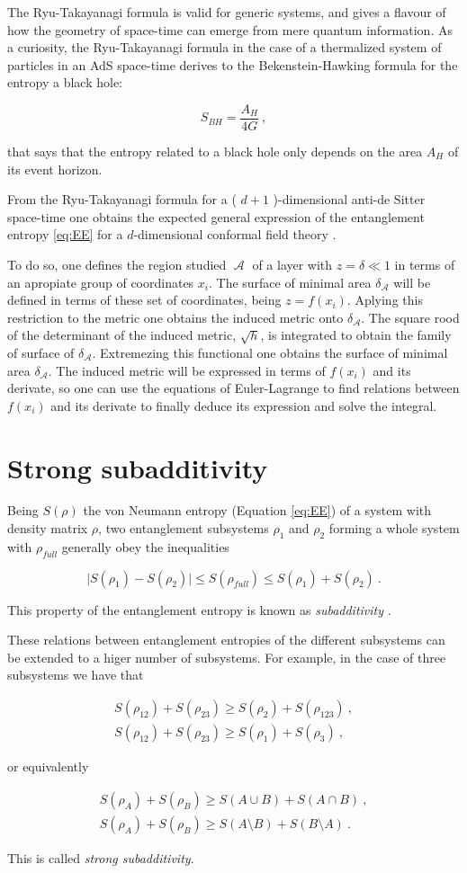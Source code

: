 \documentclass[lettersize,journal]{IEEEtran}
\providecommand{\abs}[1]{\lvert#1\rvert}
\providecommand{\eq}[2]{
    \begin{equation}
        #2
    \label{eq:#1}
    \end{equation}
}
\providecommand{\eqgat}[2]{
    \begin{gather}
        #2
    \label{eq:#1}
    \end{gather}
}
\DeclareMathOperator{\calA}{\mathcal{A}}
\begin{document}
The Ryu-Takayanagi formula is valid for generic systems, and gives a flavour of how the geometry of space-time can emerge from mere quantum information. As a curiosity, the Ryu-Takayanagi formula in the case of a thermalized system of particles in an AdS space-time derives to the Bekenstein-Hawking formula \cite{bekenstein_black_1973} for the entropy a black hole:
\eq{BH}{
    S_{BH} = \frac{ A_H }{ 4 G } \ ,
}
that says that the entropy related to a black hole only depends on the area $A_H$ of its event horizon.

From the Ryu-Takayanagi formula for a ( $d+1$ )-dimensional anti-de Sitter space-time one obtains the expected general expression of the entanglement entropy \ref{eq:EE} for a $d$-dimensional conformal field theory \cite{}.

To do so, one defines the region studied $\calA$ of a layer with $z = \delta \ll 1$ in terms of an apropiate group of coordinates $x_i$. The surface of minimal area $\delta_{\calA}$ will be defined in terms of these set of coordinates, being $z = f (x_i)$. Aplying this restriction to the metric one obtains the induced metric onto $\delta_{\calA}$. The square rood of the determinant of the induced metric, $\sqrt{h}$, is integrated to obtain the family of surface of $\delta_{\calA}$. Extremezing this functional one obtains the surface of minimal area $\delta_{\calA}$. The induced metric will be expressed in terms of $f(x_i)$ and its derivate, so one can use the equations of Euler-Lagrange to find relations between $f (x_i)$ and its derivate to finally deduce its expression and solve the integral.


\section{Strong subadditivity} \label{s:SS}

Being $S(\rho)$ the von Neumann entropy (Equation \ref{eq:EE}) of a system with density matrix $\rho$, two entanglement subsystems $\rho_1$ and $\rho_2$ forming a whole system with $\rho_{full}$ generally obey the inequalities
\eq{EE_subadd}{
    \abs{S(\rho_1)-S(\rho_2)} \le S(\rho_{full}) \le S(\rho_1) + S(\rho_2) \ .
}
This property of the entanglement entropy is known as \textit{subadditivity} \cite{headrick_holographic_2007}.

These relations between entanglement entropies of the different subsystems can be extended to a higer number of subsystems. For example, in the case of three subsystems we have that
\eqgat{EE_strong-subadd}{
    S(\rho_{12}) + S(\rho_{23}) \ge S(\rho_2) + S(\rho_{123}) \ , \nonumber \\
    S(\rho_{12}) + S(\rho_{23}) \ge S(\rho_1) + S(\rho_3) \ ,
}
or equivalently
\eqgat{EE_strong-subadd-2}{
    S(\rho_{A}) + S(\rho_{B}) \ge S(A \cup B) + S(A \cap B) \ , \nonumber \\
    S(\rho_{A}) + S(\rho_{B}) \ge S(A \setminus B) + S(B \setminus A) \ .
}
This is called \textit{strong subadditivity}.
\end{document}
